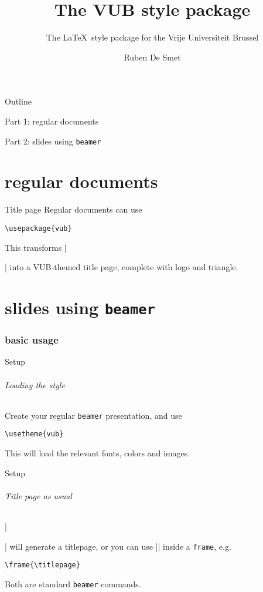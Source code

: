 \documentclass{beamer}
\title{The VUB style package}
\subtitle{The \LaTeX\ style package for the Vrije Universiteit Brussel}
\author{Ruben De Smet}
\begin{document}
\frame{\titlepage}

\begin{frame}{Outline}

  {\color{vubbleu}\large Part 1: regular documents}
  \tableofcontents[part=1]

  {\color{vubbleu}\large Part 2: slides using \texttt{beamer}}
  \tableofcontents[part=2]
\end{frame}

\part{regular documents}

\begin{frame}[fragile]{Title page}
Regular documents can use

\begin{verbatim}
\usepackage{vub}
\end{verbatim}

This transforms |\maketitle| into a VUB-themed title page,
complete with logo and triangle.
\end{frame}

\part{slides using \texttt{beamer}}
\section{basic usage}

\begin{frame}[fragile]{Setup}
\framesubtitle{Loading the style}
Create your regular \texttt{beamer} presentation, and use

\begin{verbatim}
\usetheme{vub}
\end{verbatim}

This will load the relevant fonts, colors and images.
\end{frame}

\begin{frame}[fragile]{Setup}
\framesubtitle{Title page as usual}
|\maketitle| will generate a titlepage,
or you can use |\titlepage| inside a \texttt{frame}, e.g.

\begin{verbatim}
\frame{\titlepage}
\end{verbatim}

Both are standard \texttt{beamer} commands.
\end{frame}
\end{document}
